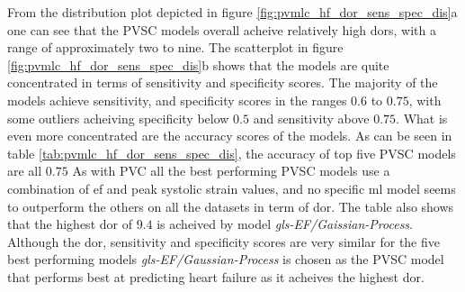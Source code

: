 From the distribution plot depicted in figure \ref{fig:pvmlc_hf_dor_sens_spec_dis}a one can see that the PVSC models overall acheive relatively high \acrshort{dor}s, 
with a range of approximately two to nine.
The scatterplot in figure \ref{fig:pvmlc_hf_dor_sens_spec_dis}b shows that the models are quite concentrated in terms of sensitivity and specificity scores. 
The majority of the models achieve sensitivity, and specificity scores in the ranges $0.6$ to $0.75$, with some outliers acheiving specificity below $0.5$ and sensitivity above $0.75$.
What is even more concentrated are the accuracy scores of the models. 
As can be seen in table \ref{tab:pvmlc_hf_dor_sens_spec_dis}, the accuracy of top five PVSC models are all $0.75$
As with PVC all the best performing PVSC models use a combination of \acrshort{ef} and peak systolic strain values, 
and no specific \acrshort{ml} model seems to outperform the others on all the datasets in term of \acrshort{dor}.
The table also shows that the highest \acrshort{dor} of $9.4$ is acheived by model \textit{gls-EF/Gaissian-Process}. 
Although the \acrshort{dor}, sensitivity and specificity scores are very similar for the five best performing models \textit{gls-EF/Gaussian-Process} 
is chosen as the PVSC model that performs best at predicting heart failure as it acheives the highest \acrshort{dor}.

